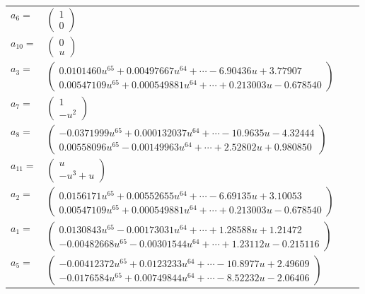 \documentclass[1p]{elsarticle_modified}
\theoremstyle{definition}
\begin{document}
\begin{tabular}{m{7pt} m{180pt} m{7pt} m{180pt} }
\flushright $a_{6}=$&$\begin{pmatrix}1\\0\end{pmatrix}$ \\
\flushright $a_{10}=$&$\begin{pmatrix}0\\u\end{pmatrix}$ \\
\flushright $a_{3}=$&$\begin{pmatrix}0.0101460 u^{65}+0.00497667 u^{64}+\cdots-6.90436 u+3.77907\\0.00547109 u^{65}+0.000549881 u^{64}+\cdots+0.213003 u-0.678540\end{pmatrix}$ \\
\flushright $a_{7}=$&$\begin{pmatrix}1\\- u^2\end{pmatrix}$ \\
\flushright $a_{8}=$&$\begin{pmatrix}-0.0371999 u^{65}+0.000132037 u^{64}+\cdots-10.9635 u-4.32444\\0.00558096 u^{65}-0.00149963 u^{64}+\cdots+2.52802 u+0.980850\end{pmatrix}$ \\
\flushright $a_{11}=$&$\begin{pmatrix}u\\- u^3+u\end{pmatrix}$ \\
\flushright $a_{2}=$&$\begin{pmatrix}0.0156171 u^{65}+0.00552655 u^{64}+\cdots-6.69135 u+3.10053\\0.00547109 u^{65}+0.000549881 u^{64}+\cdots+0.213003 u-0.678540\end{pmatrix}$ \\
\flushright $a_{1}=$&$\begin{pmatrix}0.0130843 u^{65}-0.00173031 u^{64}+\cdots+1.28588 u+1.21472\\-0.00482668 u^{65}-0.00301544 u^{64}+\cdots+1.23112 u-0.215116\end{pmatrix}$ \\
\flushright $a_{5}=$&$\begin{pmatrix}-0.00412372 u^{65}+0.0123233 u^{64}+\cdots-10.8977 u+2.49609\\-0.0176584 u^{65}+0.00749844 u^{64}+\cdots-8.52232 u-2.06406\end{pmatrix}$ \\

\end{tabular}
\end{document}
